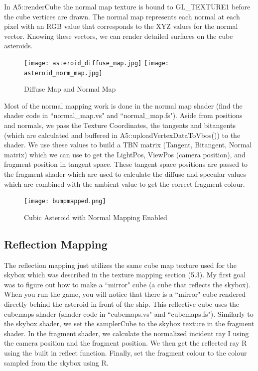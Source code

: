 \documentclass {article}
\begin{document}
In A5::renderCube the normal map texture is bound to GL\_TEXTURE1 before the cube vertices are drawn. The normal map represents each normal at each pixel with an RGB value that corresponds to the XYZ values for the normal vector. Knowing these vectors, we can render detailed surfaces on the cube asteroids.

\begin{figure}[h]
\begin{center}
	\texttt{[image: asteroid\_diffuse\_map.jpg]}
	\texttt{[image: asteroid\_norm\_map.jpg]}
	\caption{Diffuse Map and Normal Map}
  \label{fig:normmap}
\end{center}
\end{figure}

Most of the normal mapping work is done in the normal map shader (find the shader code in ``normal\_map.vs" and ``normal\_map.fs"). Aside from positions and normals, we pass the Texture Coordinates, the tangents and bitangents (which are calculated and buffered in A5::uploadVertexDataToVbos()) to the shader. We use these values to build a TBN matrix (Tangent, Bitangent, Normal matrix) which we can use to get the LightPos, ViewPos (camera position), and fragment position in tangent space. These tangent space positions are passed to the fragment shader which are used to calculate the diffuse and specular values which are combined with the ambient value to get the correct fragment colour.


\begin{figure}[h]
\begin{center}
	\texttt{[image: bumpmapped.png]}
	\caption{Cubic Asteroid with Normal Mapping Enabled}
  \label{fig:bumpmap}
\end{center}
\end{figure}

\subsection{Reflection Mapping}
\hspace{0.5cm} The reflection mapping just utilizes the same cube map texture used for the skybox which was described in the texture mapping section (5.3). My first goal was to figure out how to make a ``mirror" cube (a cube that reflects the skybox). When you run the game, you will notice that there is a ``mirror" cube rendered directly behind the asteroid in front of the ship. This reflective cube uses the cubemaps shader (shader code in ``cubemaps.vs" and ``cubemaps.fs"). Similarly to the skybox shader, we set the samplerCube to the skybox texture in the fragment shader. In the fragment shader, we calculate the normalized incident ray I using the camera position and the fragment position. We then get the reflected ray R using the built in reflect function. Finally, set the fragment colour to the colour sampled from the skybox using R.
\end{document}
